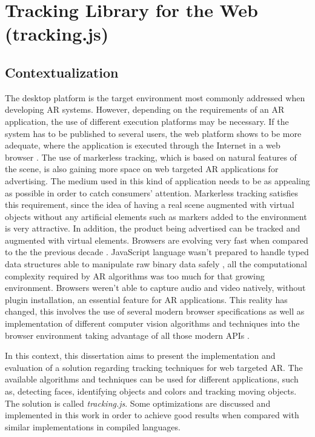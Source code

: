 \chapter{Tracking Library for the Web (tracking.js)} %
\label{cha:tracking_library_for_the_web}

\section{Contextualization} %
\label{sec:tracking_library_for_the_web:Contextualization}

The desktop platform is the target environment most commonly addressed when developing AR systems. However, depending on the requirements of an AR application, the use of different execution platforms may be necessary. If the system has to be published to several users, the web platform shows to be more adequate, where the application is executed through the Internet in a web browser \cite{Pablo2013}.
The use of markerless tracking, which is based on natural features of the scene, is also gaining more space on web targeted AR applications for advertising. The medium used in this kind of application needs to be as appealing as possible in order to catch consumers' attention. Markerless tracking satisfies this requirement, since the idea of having a real scene augmented with virtual objects without any artificial elements such as markers added to the environment is very attractive. In addition, the product being advertised can be tracked and augmented with virtual elements.
Browsers are evolving very fast when compared to the the previous decade \cite{Hickson2013}. JavaScript language wasn't prepared to handle typed data structures \cite{TypedArray2013} able to manipulate raw binary data safely \cite{Canvas2013}, all the computational complexity required by AR algorithms was too much for that growing environment. Browsers weren't able to capture audio and video \cite{MediaCapture2013,WebRTC2013} natively, without plugin installation, an essential feature for AR applications. This reality has changed, this involves the use of several modern browser specifications as well as implementation of different computer vision algorithms and techniques into the browser environment taking advantage of all those modern APIs \cite{Hickson2013,WC2006}.

In this context, this dissertation aims to present the implementation and evaluation of a solution regarding tracking techniques for web targeted AR. The available algorithms and techniques can be used for different applications, such as, detecting faces, identifying objects and colors and tracking moving objects. The solution is called \textit{tracking.js}. Some optimizations are discussed and implemented in this work in order to achieve good results when compared with similar implementations in compiled languages.

